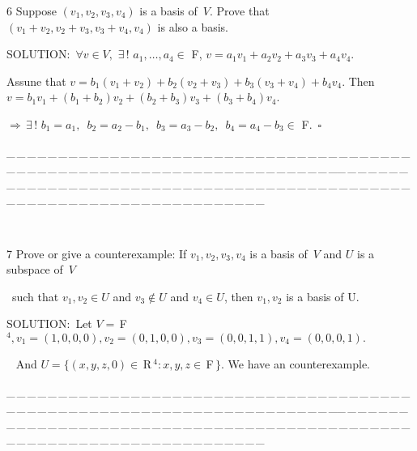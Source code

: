 \documentclass[a4paper, 11pt, UTF8]{article}
\def\Fbf{$\,{\timesbf F}\,$}
\def\Rbf{$\,{\timesbf R}\,$}
\def\Fbfc{$\,{\timesbf F}$}
\begin{document}
\begin{large}
{\timesbf\Large 6} {\timessl\Large 
Suppose $(v_1,v_2,v_3,v_4)$ is a basis of \,$V$. Prove that
$(v_1+v_2,v_2+v_3,v_3+v_4,v_4)$ is also a basis.
}\par
{\timesbf S\footnotesize{OLUTION:}}\,\,\,$\forall v\in V,\,\,\exists\,!\,\,a_1,\dots,a_4\in$ {\timesbf F}, $v=a_1 v_1+a_2 v_2+a_3 v_3+a_4 v_4.$\par\quad
Assune that $v=b_1(v_1+v_2)+b_2(v_2+v_3)+b_3(v_3+v_4)+b_4 v_4$. Then $v=b_1 v_1+(b_1+b_2)v_2+(b_2+b_3)v_3+(b_3+b_4)v_4$.\par\quad
$\Rightarrow\,\exists\,!\,\,b_1=a_1,\,\,\,b_2=a_2-b_1,\,\,\,b_3=a_3-b_2,\,\,\,b_4=a_4-b_3\in$ {\timesbf F}.$\,\,\,\square$
\par
{\tiny \_\,\_\,\_\,\_\,\_\,\_\,\_\,\_\,\_\,\_\,\_\,\_\,\_\,\_\,\_\,\_\,\_\,\_\,\_\,\_\,\_\,\_\,\_\,\_\,\_\,\_\,\_\,\_\,\_\,\_\,\_\,\_\,\_\,\_\,\_\,\_\,\_\,\_\,\_\,\_\,\_\,\_\,\_\,\_\,\_\,\_\,\_\,\_\,\_\,\_\,\_\,\_\,\_\,\_\,\_\,\_\,\_\,\_\,\_\,\_\,\_\,\_\,\_\,\_\,\_\,\_\,\_\,\_\,\_\,\_\,\_\_\,\_\,\_\,\_\,\_\,\_\,\_\,\_\,\_\,\_\,\_\,\_\,\_\,\_\,\_\,\_\,\_\,\_\,\_\,\_\,\_\,\_\,\_\,\_\,\_\,\_\,\_\,\_\,\_\,\_\,\_\,\_\,\_\,\_\,\_\,\_\,\_\,\_\,\_\,\_\,\_\,\_\,\_\,\_\,\_\,\_\,\_\,\_\,\_\,\_\,\_\,\_\,\_\,\_\,\_\,\_\,\_\,\_\,\_\,\_\,\_\,\_\,\_\,\_\,\_\,\_\,\_\,\_\,\_\,\_\,\_}{\tiny\,\par}

{\timesbf\Large 7} {\timessl\Large 
Prove or give a counterexample: If $v_1,v_2,v_3,v_4$ is a basis of \,$V$ and $U$ is a subspace of \,$V$}\par\quad\,
{\timessl\Large such that $v_1,v_2\in U$ and $v_3\not\in U$ and $v_4\in U$, then $v_1,v_2$ is a basis of U.}\par
{\timesbf S\footnotesize{OLUTION:}}\,\,\,Let $V=\Fbfc^4,v_1=(1,0,0,0),v_2=(0,1,0,0),v_3=(0,0,1,1),v_4=(0,0,0,1).$\par\qquad\quad\quad\,\,\,
And $U=\{(x,y,z,0)\in\Rbf^4:x,y,z\in\Fbf\}$. We have an counterexample.\par
{\tiny \_\,\_\,\_\,\_\,\_\,\_\,\_\,\_\,\_\,\_\,\_\,\_\,\_\,\_\,\_\,\_\,\_\,\_\,\_\,\_\,\_\,\_\,\_\,\_\,\_\,\_\,\_\,\_\,\_\,\_\,\_\,\_\,\_\,\_\,\_\,\_\,\_\,\_\,\_\,\_\,\_\,\_\,\_\,\_\,\_\,\_\,\_\,\_\,\_\,\_\,\_\,\_\,\_\,\_\,\_\,\_\,\_\,\_\,\_\,\_\,\_\,\_\,\_\,\_\,\_\,\_\,\_\,\_\,\_\,\_\,\_\_\,\_\,\_\,\_\,\_\,\_\,\_\,\_\,\_\,\_\,\_\,\_\,\_\,\_\,\_\,\_\,\_\,\_\,\_\,\_\,\_\,\_\,\_\,\_\,\_\,\_\,\_\,\_\,\_\,\_\,\_\,\_\,\_\,\_\,\_\,\_\,\_\,\_\,\_\,\_\,\_\,\_\,\_\,\_\,\_\,\_\,\_\,\_\,\_\,\_\,\_\,\_\,\_\,\_\,\_\,\_\,\_\,\_\,\_\,\_\,\_\,\_\,\_\,\_\,\_\,\_\,\_\,\_\,\_\,\_\,\_}\par


\end{large}
\end{document}
